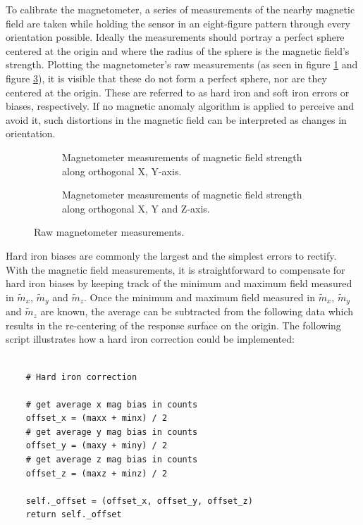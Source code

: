 To calibrate the magnetometer, a series of measurements of the nearby magnetic field are taken while holding the sensor in an eight-figure pattern through every orientation possible. Ideally the measurements should portray a perfect sphere centered at the origin and where the radius of the sphere is the magnetic field's strength. Plotting the magnetometer's raw measurements (as seen in figure \ref{plt:raw_magnetometer} and figure \ref{plt:raw_magnetometer3D}), it is visible that these do not form a perfect sphere, nor are they centered at the origin. These are referred to as hard iron and soft iron errors or biases, respectively. If no magnetic anomaly algorithm is applied to perceive and avoid it, such distortions in the magnetic field can be interpreted as changes in orientation.

\begin{figure}[!h]
  \centering
  \begin{subfigure}{0.7\textwidth}
    \centering
    \resizebox{1\linewidth}{!}{}
    \caption{Magnetometer measurements of magnetic field strength along orthogonal X, Y-axis.}
    \label{plt:raw_magnetometer}
  \end{subfigure}

  \begin{subfigure}{0.7\textwidth}
    \centering
    \resizebox{1\linewidth}{!}{}
    \caption{Magnetometer measurements of magnetic field strength along orthogonal X, Y and Z-axis.}
    \label{plt:raw_magnetometer3D}
  \end{subfigure}
  \caption{Raw magnetometer measurements.}
\end{figure}

Hard iron biases are commonly the largest and the simplest errors to rectify. With the magnetic field measurements, it is straightforward to compensate for hard iron biases by keeping track of the minimum and maximum field measured in $\widetilde{m}_x$, $\widetilde{m}_y$ and $\widetilde{m}_z$. Once the minimum and maximum field measured in $\widetilde{m}_x$, $\widetilde{m}_y$ and $\widetilde{m}_z$ are known, the average can be subtracted from the following data which results in the re-centering of the response surface on the origin. The following script illustrates how a hard iron correction could be implemented:

\lstset{language=Python}
\begin{lstlisting}[frame=single]  % Start your code-block

    # Hard iron correction

    # get average x mag bias in counts
    offset_x = (maxx + minx) / 2
    # get average y mag bias in counts
    offset_y = (maxy + miny) / 2
    # get average z mag bias in counts
    offset_z = (maxz + minz) / 2

    self._offset = (offset_x, offset_y, offset_z)
    return self._offset
\end{lstlisting}

